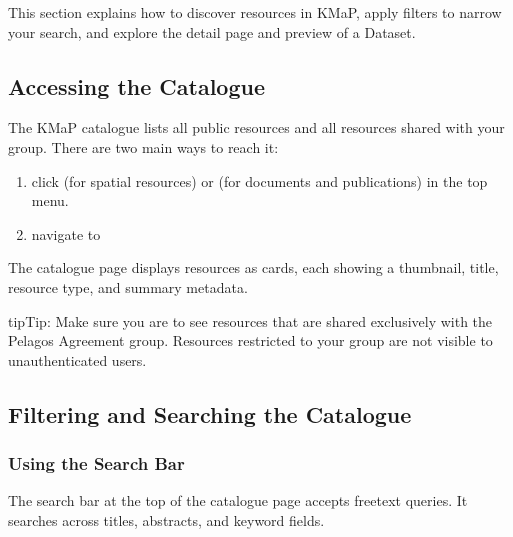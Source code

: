 \documentclass[letterpaper,10pt,english]{sphinxmanual}
\begin{document}
\sphinxAtStartPar
This section explains how to discover resources in KMaP, apply filters to narrow your
search, and explore the detail page and preview of a Dataset.


\subsection{Accessing the Catalogue}
\label{\detokenize{en/02_find_and_visualize:accessing-the-catalogue}}
\sphinxAtStartPar
The KMaP catalogue lists all public resources and all resources shared with your group.
There are two main ways to reach it:
\begin{enumerate}
%
\item {} 
\sphinxAtStartPar
{} \textendash{} click  (for spatial resources) or 
(for documents and publications) in the top menu.

\item {} 
\sphinxAtStartPar
{} \textendash{} navigate to 

\end{enumerate}

\sphinxAtStartPar
The catalogue page displays resources as cards, each showing a thumbnail, title, resource
type, and summary metadata.

\begin{sphinxadmonition}{tip}{Tip:}
\sphinxAtStartPar
Make sure you are  to see resources that are shared exclusively with the
Pelagos Agreement group. Resources restricted to your group are not visible to
unauthenticated users.
\end{sphinxadmonition}


\subsection{Filtering and Searching the Catalogue}
\label{\detokenize{en/02_find_and_visualize:filtering-and-searching-the-catalogue}}

\subsubsection{Using the Search Bar}
\label{\detokenize{en/02_find_and_visualize:using-the-search-bar}}
\sphinxAtStartPar
The search bar at the top of the catalogue page accepts free\sphinxhyphen{}text queries. It searches
across titles, abstracts, and keyword fields.
\end{document}
